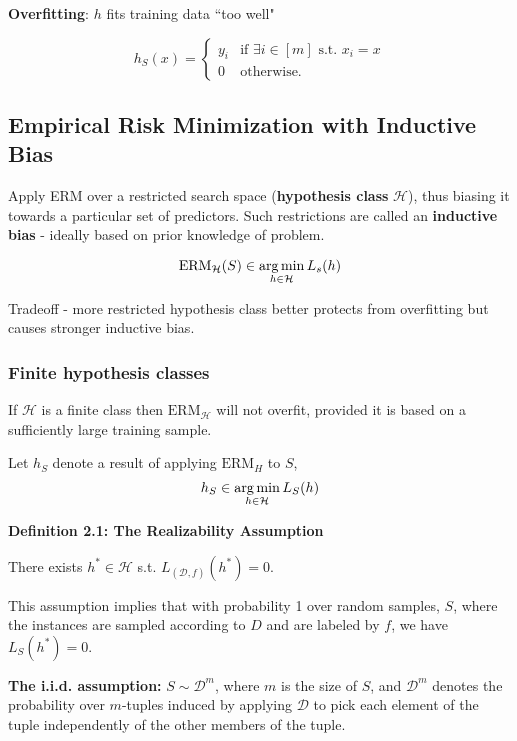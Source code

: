 \textbf{Overfitting}: $h$ fits training data ``too well"

\begin{equation*}
    h_S(x) = 
    \begin{cases}
        y_i & \text{if } \exists i \in [m] \text{ s.t. } x_i = x \\
        0 & \text{otherwise.}
    \end{cases}
\end{equation*}

\subsection{Empirical Risk Minimization with Inductive Bias}

Apply ERM over a restricted search space (\textbf{hypothesis class} $\mathcal{H}$), thus biasing it towards a particular set of predictors. Such restrictions are called an \textbf{inductive bias} - ideally based on prior knowledge of problem.

$$\textrm{ERM}_{\mathcal{H}} (S) \in \operatorname*{arg\,min}_{h \in \mathcal{H}} L_s(h)$$

Tradeoff - more restricted hypothesis class better protects from overfitting but causes stronger inductive bias.

\subsubsection{Finite hypothesis classes}

If $\mathcal{H}$ is a finite class then $\text{ERM}_{\mathcal{H}}$ will not overfit, provided it is based on a sufficiently large training sample.

Let $h_S$ denote a result of applying $\text{ERM}_H$ to $S$,
$$h_S \in \operatorname*{arg\,min}_{h \in \mathcal{H}} L_S(h)$$

\textbf{Definition 2.1: The Realizability Assumption}

There exists $h^* \in \mathcal{H}$ s.t. $L_{(\mathcal{D}, f)}(h^*) = 0$.

This assumption implies that with probability 1 over random samples, $S$, where the instances are sampled according to $D$ and are labeled by $f$, we have $L_S(h^*) = 0$.

\bigskip

\textbf{The i.i.d. assumption:} $S \sim \mathcal{D}^m$, where $m$ is the size of $S$, and $\mathcal{D}^m$ denotes the probability over $m$-tuples induced by applying $\mathcal{D}$ to pick each element of the tuple independently of the other members of the tuple.

